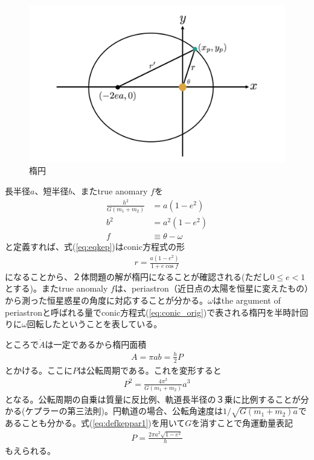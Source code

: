 \begin{figure}[]
 \begin{center}
	\includegraphics[bb=0 0 695 428,width=1.0\linewidth]{fig/ellip.png}
\end{center}
	\caption{楕円}
	\label{fig:ellip}
\end{figure} 

長半径$a$、短半径$b$、またtrue anomary $f$を
\begin{align}
\label{eq:defkeppar1}
\frac{h^2}{G (m_1 + m_2)} &= a (1 - e^2) \\
\label{eq:defkeppar2}
b^2 &= a^2 (1 - e^2) \\
\label{eq:defkeppar3}
f &\equiv \theta - \omega  
\end{align}
と定義すれば、式(\ref{eq:eqkep})はconic方程式の形
\begin{align}
\label{eq:conic_kepler}
r =  \frac{a (1-e^2)}{ 1 + e \cos{f}} 
\end{align}
になることから、２体問題の解が楕円になることが確認される(ただし$0 \le e < 1$とする)。またtrue anomaly $f$は、periastron（近日点の太陽を恒星に変えたもの）から測った恒星惑星の角度に対応することが分かる。$\omega$はthe argument of periastronと呼ばれる量でconic方程式(\ref{eq:conic_orig})で表される楕円を半時計回りに$\omega$回転したということを表している。

ところで$\dot{A}$は一定であるから楕円面積
\begin{align}
A = \pi a b = \frac{h}{2} P
\end{align}
とかける。ここに$P$は公転周期である。これを変形すると
\begin{align}
\label{eq:kep3}
 P^2 = \frac{4 \pi^2}{G (m_1+m_2)} a^3 
\end{align}
となる。公転周期の自乗は質量に反比例、軌道長半径の３乗に比例することが分かる(ケプラーの第三法則)。円軌道の場合、公転角速度は$1/\sqrt{G (m_1+m_2) a}$であることも分かる。式(\ref{eq:defkeppar1})を用いて$G$を消すことで角運動量表記
\begin{align}
\label{eq:kep3_1}
 P = \frac{2 \pi a^2 \sqrt{1-e^2}}{h} 
\end{align}
もえられる。

